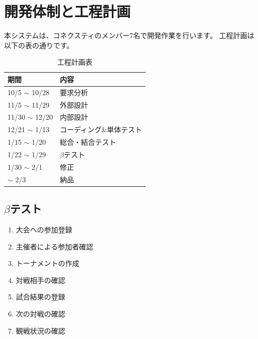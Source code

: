 \section{開発体制と工程計画}

本システムは、コネクスティのメンバー7名で開発作業を行います。
工程計画は以下の表の通りです。

\begin{table}[H]
    \centering
    \caption{工程計画表}
    \begin{tabular}{|l|l|}
        \hline
        期間 & 内容 \\ \hline
        10/5 $\sim$ 10/28 & 要求分析 \\ \hline
        11/5 $\sim$ 11/29 & 外部設計 \\ \hline
        11/30 $\sim$ 12/20 & 内部設計 \\ \hline
        12/21 $\sim$ 1/13 & コーディング\&単体テスト \\ \hline
        1/15 $\sim$ 1/20 & 総合・結合テスト \\ \hline
        1/22 $\sim$ 1/29 & $\beta$テスト \\ \hline
        1/30 $\sim$ 2/1 & 修正 \\ \hline
        $\sim$ 2/3 & 納品 \\ \hline
    \end{tabular}
\end{table}

\subsection*{$\beta$テスト}
\begin{enumerate}
    \item 大会への参加登録
    \item 主催者による参加者確認
    \item トーナメントの作成
    \item 対戦相手の確認
    \item 試合結果の登録
    \item 次の対戦の確認
    \item 観戦状況の確認
\end{enumerate}